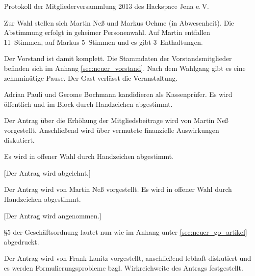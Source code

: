 \documentclass[ngerman]{scrartcl}
\begin{document}
\begin{Protokoll}{Protokoll der Mitgliederversammlung 2013 des Hackspace
    Jena e.\,V.}


Zur Wahl stellen sich Martin Neß und Markus Oehme (in Abwesenheit). Die Abstimmung
erfolgt in geheimer Personenwahl. Auf Martin entfallen 11~Stimmen, auf
Markus 5~Stimmen und es gibt 3~Enthaltungen.

Der Vorstand ist damit komplett.
Die Stammdaten der Vorstandsmitglieder befinden sich im Anhang \ref{sec:neuer_vorstand}.
Nach dem Wahlgang gibt es eine zehnminütige Pause. Der Gast verlässt
die Veranstaltung.


Adrian Pauli und Gerome Bochmann kandidieren als Kassenprüfer. Es wird
öffentlich und im Block durch Handzeichen abgestimmt.
\begin{Abstimmung}
\end{Abstimmung}



Der Antrag über die Erhöhung der Mitgliedsbeitrage wird von Martin Neß
vorgestellt.  Anschließend wird über vermutete finanzielle
Auswirkungen diskutiert.

Es wird in offener Wahl durch Handzeichen abgestimmt.
\begin{Abstimmung}
  [Der Antrag wird
  abgelehnt.]
\end{Abstimmung}

Der Antrag wird von Martin Neß vorgestellt.
Es wird in offener Wahl durch Handzeichen abgestimmt.
\begin{Abstimmung}
  [Der Antrag wird
  angenommen.]
\end{Abstimmung}
§5 der Geschäftsordnung lautet nun wie im Anhang unter
\ref{sec:neuer_go_artikel} abgedruckt.

Der Antrag wird
von Frank Lanitz vorgestellt, anschließend lebhaft diskutiert und es
werden Formulierungsprobleme bzgl. Wirkreichweite des Antrags
festgestellt.


\end{Protokoll}
\end{document}
